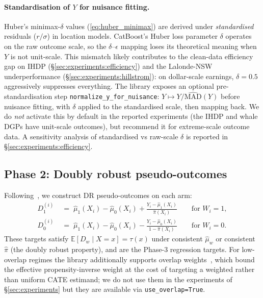 \paragraph{Standardisation of $Y$ for nuisance fitting.}
Huber's minimax-$\delta$ values (\eqref{eq:huber_minimax}) are
derived under \emph{standardised} residuals ($r/\sigma$) in
location models. CatBoost's Huber loss parameter $\delta$ operates
on the raw outcome scale, so the $\delta$--$\epsilon$ mapping loses
its theoretical meaning when $Y$ is not unit-scale. This mismatch
likely contributes to the clean-data efficiency gap on IHDP
(\S\ref{sec:experiments:efficiency}) and the Lalonde-NSW
underperformance (\S\ref{sec:experiments:hillstrom}): on
dollar-scale earnings, $\delta = 0.5$ aggressively suppresses
everything. The library exposes an optional pre-standardisation step
\texttt{normalize\_y\_for\_nuisance}: $Y \mapsto Y /
\widehat{\mathrm{MAD}}(Y)$ before nuisance fitting, with $\delta$
applied to the standardised scale, then mapping back. We do
\emph{not} activate this by default in the reported experiments
(the IHDP and whale DGPs have unit-scale outcomes), but recommend
it for extreme-scale outcome data. A sensitivity analysis of
standardised vs raw-scale $\delta$ is reported in
\S\ref{sec:experiments:efficiency}.

\subsection{Phase 2: Doubly robust pseudo-outcomes}
\label{sec:method:phase2}
Following~\citet{kennedy2020optimal}, we construct DR
pseudo-outcomes on each arm:
\begin{align}
  D_1^{(i)} &\;=\; \hat{\mu}_1(X_i) - \hat{\mu}_0(X_i) +
    \frac{Y_i - \hat{\mu}_1(X_i)}{\hat{\pi}(X_i)}
    \qquad \text{for } W_i = 1, \\
  D_0^{(i)} &\;=\; \hat{\mu}_1(X_i) - \hat{\mu}_0(X_i) -
    \frac{Y_i - \hat{\mu}_0(X_i)}{1 - \hat{\pi}(X_i)}
    \qquad \text{for } W_i = 0.
\end{align}
These targets satisfy $\mathbb{E}[D_w \mid X = x] = \tau(x)$ under
consistent $\hat{\mu}_w$ or consistent $\hat{\pi}$ (the doubly
robust property), and are the Phase-3 regression targets. For
low-overlap regimes the library additionally supports overlap
weights~\citep{li2018balancing}, which bound the effective
propensity-inverse weight at the cost of targeting a weighted
rather than uniform CATE estimand; we do not use them in the
experiments of \S\ref{sec:experiments} but they are available
via \texttt{use\_overlap=True}.

